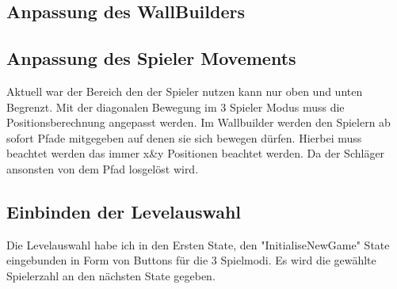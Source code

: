 \subsection{Anpassung des WallBuilders}
\subsection{Anpassung des Spieler Movements}
Aktuell war der Bereich den der Spieler nutzen kann nur oben und unten Begrenzt. Mit der diagonalen Bewegung im 3 Spieler Modus muss die Positionsberechnung angepasst werden.
\newline
Im Wallbuilder werden den Spielern ab sofort Pfade mitgegeben auf denen sie sich bewegen dürfen. Hierbei muss beachtet werden das immer x&y Positionen beachtet werden. Da der Schläger ansonsten von dem Pfad losgelöst wird.
\subsection{Einbinden der Levelauswahl}
Die Levelauswahl habe ich in den Ersten State, den "InitialiseNewGame" State eingebunden in Form von Buttons für die 3 Spielmodi.
Es wird die gewählte Spielerzahl an den nächsten State gegeben.
